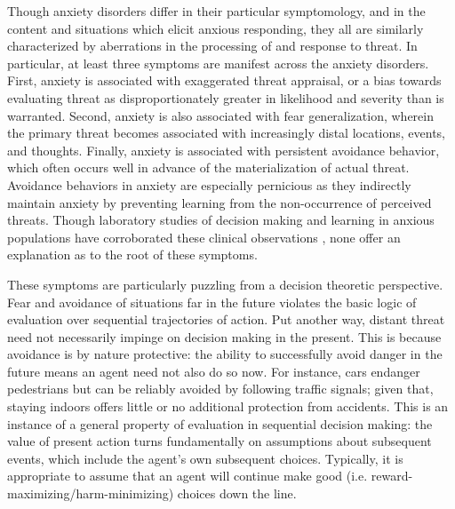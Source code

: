 \documentclass[11pt]{article} %
\begin{document}
Though anxiety disorders differ in their particular symptomology, and in the content and situations which elicit anxious responding, they all are similarly characterized by aberrations in the processing of and response to threat\citep{dsm5}. In particular, at least three symptoms are manifest across the anxiety disorders. First, anxiety is associated with exaggerated threat appraisal, or a bias towards evaluating threat as disproportionately greater in likelihood and severity than is warranted\citep{ClarkBeck2011}. Second, anxiety is also associated with fear generalization, wherein the primary threat becomes associated with increasingly distal locations, events, and thoughts\citep{dymond2015}. Finally, anxiety is associated with persistent avoidance behavior, which often occurs well in advance of the materialization of actual threat\citep{Arnaudova2017}. Avoidance behaviors in anxiety are especially pernicious as they indirectly maintain anxiety by preventing learning from the non-occurrence of perceived threats. Though laboratory studies of decision making and learning in anxious populations have corroborated these clinical observations \citep{Harle2017, norbury2018, Aylward2019}, none offer an explanation as to the root of these symptoms.

These symptoms are particularly puzzling from a decision theoretic perspective\citep{huys2015}. Fear and avoidance of situations far in the future violates the basic logic of evaluation over sequential trajectories of action. Put another way, distant threat need not necessarily impinge on decision making in the present. This is because avoidance is by nature protective: the ability to successfully avoid danger in the future means an agent need not also do so now. For instance, cars endanger pedestrians but can be reliably avoided by following traffic signals; given that, staying indoors offers little or no additional protection from accidents. This is an instance of a general property of evaluation in sequential decision making: the value of present action turns fundamentally on assumptions about subsequent events, which include the agent's own subsequent choices. Typically, it is appropriate to assume that an agent will continue make good (i.e. reward-maximizing/harm-minimizing) choices down the line.
\end{document}
